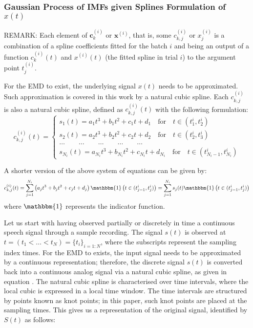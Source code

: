 \subsubsection{Gaussian Process of IMFs given Splines Formulation of $x(t)$}

{\color{red}
REMARK: Each element of $\mathbf{c}_k^{(i)}$ or $\mathbf{x}^{(i)}$, that is, some $c_{k,j}^{(i)}$ or $x_{j}^{(i)}$ is a combination of a spline coefficients fitted for the batch $i$ and being an output of a function $c_k^{(i)}(t)$ and $x^{(i)}(t)$ (the fitted spline in trial $i$) to the argument point $t^{(i)}_j$.
}



For the EMD to exist, the underlying signal $x(t)$ needs to be approximated. Such approximation is covered in this work by a natural cubic spline. Each $c_{k,j}^{(i)}$  is also a natural cubic spline, defined as $c_{k,j}^{(i)}(t)$ with the following formulation:
\begin{equation*}
c_{k,j}^{(i)}(t) = \begin{cases}
s_1(t) = a_1 t^3 + b_1 t^2 + c_1 t + d_1 \quad \mbox{for} \quad t \in (t_1^i, t_2^i) \\
s_2(t) = a_2 t^3 + b_2 t^2 + c_2 t + d_2 \quad \mbox{for} \quad t \in (t_2^i, t_3^i)\\
\dots \quad \quad \dots \quad \quad \dots \quad \quad \dots \quad \quad \dots\\
s_{N_i}(t) = a_{N_i} t^3 + b_{N_i} t^2 + c_{N_i} t + d_{N_i} \quad \mbox{for} \quad t \in (t_{{N_i}-1}^i, t_{N_i}^i)
\end{cases}
\end{equation*}

A shorter version of the above system of equations can be given by:
\begin{equation}
c_{k,j}^{(i)}(t) = \sum_{j = 1}^{N_i} \left( a_j t^3 + b_j t^2 + c_j t + d_j \right){\mathbbm{1}} \left( t \in (t_{j-1}^i, t_j^i) \right) = \sum_{j = 1}^{N_i} s_j (t) {\mathbbm{1}} \left( t \in (t_{j-1}^i, t_j^i) \right) 
\end{equation}
where $\mathbbm{1}$ represents the indicator function.

Let us start with having observed partially or discretely in time a continuous speech signal through a sample recording. The signal $s(t)$ is observed at $t =( t_1 < \dots <t_N ) = \{ t_i \}_{i=1:N}$, where the subscripts represent the sampling index times. For the EMD to exists, the input signal needs to be approximated by a continuous representation; therefore, the discrete signal $s(t)$ is converted back into a continuous analog signal via a natural cubic spline, as given in equation \label{cubic_spl}. The natural cubic spline is characterised over time intervals, where the local cubic is expressed in a local time window. The time intervals are structured by points known as knot points; in this paper, such knot points are placed at the sampling times. This gives us a representation of the original signal, identified by $S(t)$ as follows:

